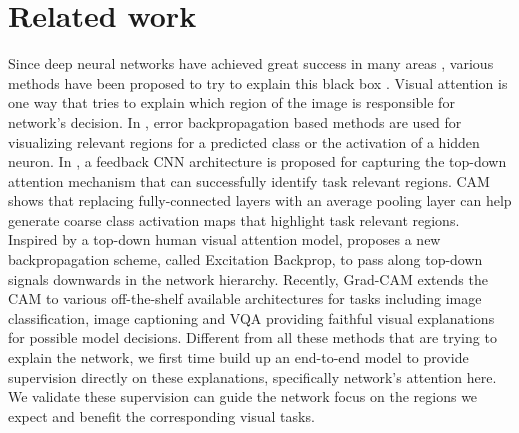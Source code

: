\documentclass[10pt,twocolumn,letterpaper]{article}
\begin{document}
%
%
%
%
%



\section{Related work}\label{sc:related_work}

Since deep neural networks have achieved great success in many areas \cite{gong2017learning,zhang2017image}, various methods have been proposed to try to explain this black box \cite{simonyan2013deep,zeiler2014visualizing,cao2015look,zhou2014object,zhang2017mdnet}. Visual attention is one way that tries to explain which region of the image is responsible for network's decision. In \cite{simonyan2013deep,zeiler2014visualizing,springenberg2015striving}, error backpropagation based methods are used for visualizing relevant regions for a predicted class or the activation of a hidden neuron. In \cite{cao2015look}, a feedback CNN architecture is proposed for capturing the top-down attention mechanism that can successfully identify task relevant regions. CAM \cite{zhou2016learning} shows that replacing fully-connected layers with an average pooling layer can help generate coarse class activation maps that highlight task relevant regions. Inspired by a top-down human visual attention model, \cite{zhang2016top} proposes a new backpropagation scheme, called Excitation Backprop, to pass along top-down signals downwards in the network hierarchy. Recently, Grad-CAM \cite{grad-cam} extends the CAM to various off-the-shelf available architectures for tasks including image classification, image captioning and VQA providing faithful visual explanations for possible model decisions. Different from all these methods that are trying to explain the network, we first time build up an end-to-end model to provide supervision directly on these explanations, specifically network's attention here. We validate these supervision can guide the network focus on the regions we expect and benefit the corresponding visual tasks.
\end{document}
